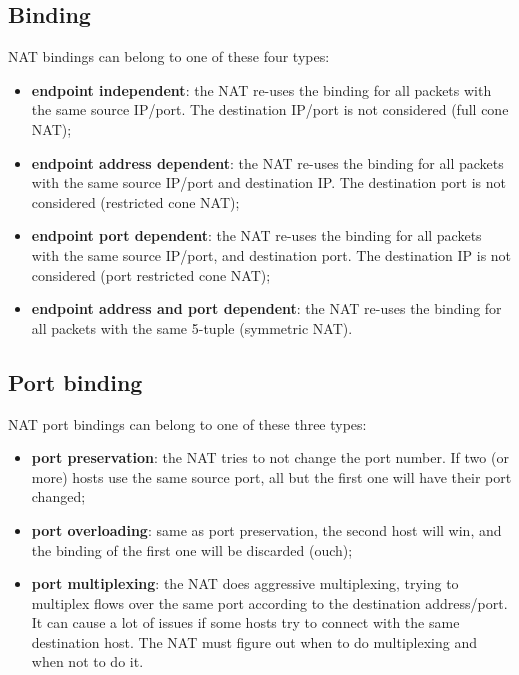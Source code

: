 
\subsection{Binding}
\label{nat:binding_2}
NAT bindings can belong to one of these four types:

\begin{itemize}
    \item \textbf{endpoint independent}: the NAT re-uses the binding for all packets with the same source IP/port. The
destination IP/port is not considered (full cone NAT);
    \item \textbf{endpoint address dependent}: the NAT re-uses the binding for all packets with the same source IP/port and destination IP. The destination port is not considered (restricted cone NAT);
    \item \textbf{endpoint port dependent}: the NAT re-uses the binding for all packets with the same source IP/port, and destination port. The destination IP is not considered (port restricted cone NAT);
    \item \textbf{endpoint address and port dependent}: the NAT re-uses the binding for all packets with the same 5-tuple (symmetric NAT).
\end{itemize}


\subsection{Port binding}
NAT port bindings can belong to one of these three types:

\begin{itemize}
    \item \textbf{port preservation}: the NAT tries to not change the port number. If two (or more) hosts use the same source port, all but the first one will have their port changed;
    \item \textbf{port overloading}: same as port preservation, the second host will win, and the binding of the first one will be discarded (ouch);
    \item \textbf{port multiplexing}: the NAT does aggressive multiplexing, trying to multiplex flows over the same port
according to the destination address/port. It can cause a lot of issues if some hosts try to connect with the same destination host. The NAT must figure out when to do multiplexing and when not to do it.
\end{itemize}

